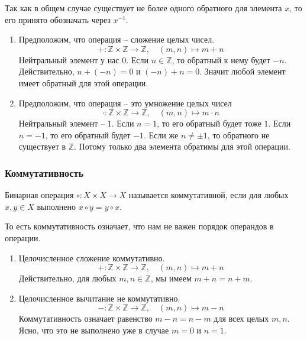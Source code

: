 Так как в общем случае существует не более одного обратного для элемента $x$, то его принято обозначать через $x^{-1}$.

\begin{examples}
\begin{enumerate}
\item Предположим, что операция -- сложение целых чисел.
\[
+\colon \mathbb Z\times \mathbb Z\to \mathbb Z,\quad (m,n)\mapsto m+n
\]
Нейтральный элемент у нас $0$.
Если $n\in \mathbb Z$, то обратный к нему будет $-n$.
Действительно, $n + (-n) = 0$ и $(-n) + n = 0$.
Значит любой элемент имеет обратный для этой операции.

\item Предположим, что операция -- это умножение целых чисел
\[
\cdot\colon \mathbb Z\times \mathbb Z\to \mathbb Z,\quad (m,n)\mapsto m\cdot n
\]
Нейтральный элемент -- $1$.
Если $n = 1$, то его обратный будет тоже $1$.
Если $n = -1$, то его обратный будет $-1$.
Если же $n\neq \pm1$, то обратного не существует в $\mathbb Z$.
Потому только два элемента обратимы для этой операции.
\end{enumerate}
\end{examples}

\subsubsection{Коммутативность}

\begin{definition}
Бинарная операция $\circ \colon X\times X\to X$ называется коммутативной, если для любых $x,y\in X$ выполнено $x \circ y = y\circ x$.
\end{definition}

То есть коммутативность означает, что нам не важен порядок операндов в операции.

\begin{examples}
\begin{enumerate}
\item Целочисленное сложение коммутативно.
\[
+\colon \mathbb Z\times \mathbb Z\to \mathbb Z,\quad (m,n)\mapsto m+n
\]
Действительно, для любых $m,n\in \mathbb Z$, мы имеем $m + n = n + m$.

\item Целочисленное вычитание не коммутативно.
\[
-\colon \mathbb Z\times \mathbb Z\to \mathbb Z,\quad (m,n)\mapsto m-n
\]
Коммутативность означает равенство $m - n = n - m$ для всех целых $m,n$.
Ясно, что это не выполнено уже в случае $m = 0$ и $n = 1$.
\end{enumerate}
\end{examples}

